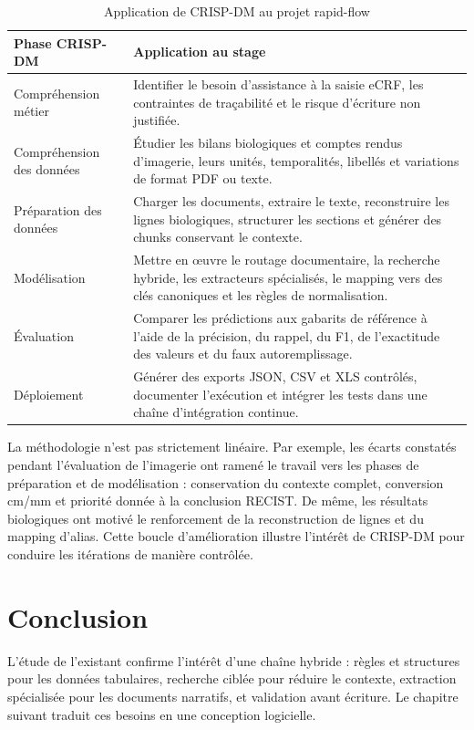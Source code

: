 \begin{table}[H]
\centering
\caption{Application de CRISP-DM au projet rapid-flow}
\begin{tabularx}{\textwidth}{p{}X}
\toprule
Phase CRISP-DM & Application au stage\\
\midrule
Compréhension métier & Identifier le besoin d'assistance à la saisie eCRF, les contraintes de traçabilité et le risque d'écriture non justifiée.\\
Compréhension des données & Étudier les bilans biologiques et comptes rendus d'imagerie, leurs unités, temporalités, libellés et variations de format PDF ou texte.\\
Préparation des données & Charger les documents, extraire le texte, reconstruire les lignes biologiques, structurer les sections et générer des chunks conservant le contexte.\\
Modélisation & Mettre en œuvre le routage documentaire, la recherche hybride, les extracteurs spécialisés, le mapping vers des clés canoniques et les règles de normalisation.\\
Évaluation & Comparer les prédictions aux gabarits de référence à l'aide de la précision, du rappel, du F1, de l'exactitude des valeurs et du faux autoremplissage.\\
Déploiement & Générer des exports JSON, CSV et XLS contrôlés, documenter l'exécution et intégrer les tests dans une chaîne d'intégration continue.\\
\bottomrule
\end{tabularx}
\end{table}

La méthodologie n'est pas strictement linéaire. Par exemple, les écarts constatés pendant l'évaluation de l'imagerie ont ramené le travail vers les phases de préparation et de modélisation : conservation du contexte complet, conversion cm/mm et priorité donnée à la conclusion RECIST. De même, les résultats biologiques ont motivé le renforcement de la reconstruction de lignes et du mapping d'alias. Cette boucle d'amélioration illustre l'intérêt de CRISP-DM pour conduire les itérations de manière contrôlée.

\section{Conclusion}
L'étude de l'existant confirme l'intérêt d'une chaîne hybride : règles et structures pour les données tabulaires, recherche ciblée pour réduire le contexte, extraction spécialisée pour les documents narratifs, et validation avant écriture. Le chapitre suivant traduit ces besoins en une conception logicielle.
